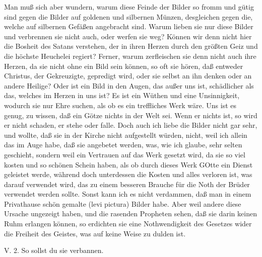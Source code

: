 Man muß sich aber wundern, warum diese Feinde der Bilder so fromm und gütig sind gegen die Bilder auf goldenen und silbernen Münzen, desgleichen gegen die, welche auf silbernen Gefäßen angebracht sind. Warum lieben sie nur diese Bilder und verbrennen sie nicht auch, oder werfen sie weg? Können wir denn nicht hier die Bosheit des Satans verstehen, der in ihren Herzen durch den größten Geiz und die höchste Heuchelei regiert? Ferner, warum zerfleischen sie denn nicht auch ihre Herzen, da sie nicht ohne ein Bild sein können, so oft sie hören, daß entweder Christus, der Gekreuzigte, gepredigt wird, oder sie selbst an ihn denken oder an andere Heilige? Oder ist ein Bild in den Augen, das außer uns ist, schädlicher als das, welches im Herzen in uns ist? Es ist ein Wüthen und eine Unsinnigkeit, wodurch sie nur Ehre suchen, als ob es ein treffliches Werk wäre. Uns ist es
genug, zu wissen, daß ein Götze nichts in der Welt sei. Wenn er nichts ist, so wird er nicht schaden, er stehe oder falle. Doch auch ich liebe die Bilder nicht gar sehr, und wollte, daß sie in der Kirche nicht aufgestellt würden, nicht, weil ich allein das im Auge habe, daß sie angebetet werden, was, wie ich glaube, sehr selten geschieht, sondern weil ein Vertrauen auf das Werk gesetzt wird, da sie so viel kosten und so schönen Schein haben, als ob durch dieses Werk GOtte ein Dienst geleistet werde, während doch unterdessen die Kosten und alles verloren ist, was darauf verwendet wird, das zu einem besseren Brauche für die Noth der Brüder verwendet werden sollte. Sonst kann ich es nicht verdammen, daß man in einem Privathause schön gemalte (levi pictura) Bilder habe. Aber weil andere diese Ursache ungezeigt haben, und die rasenden Propheten sehen, daß sie darin keinen Ruhm erlangen können, so erdichten sie eine Nothwendigkeit des Gesetzes wider die Freiheit des Geistes, was auf keine Weise zu dulden ist.

\begin{schriftzitat}
V. 2. So sollst du sie verbannen.
\end{schriftzitat}

